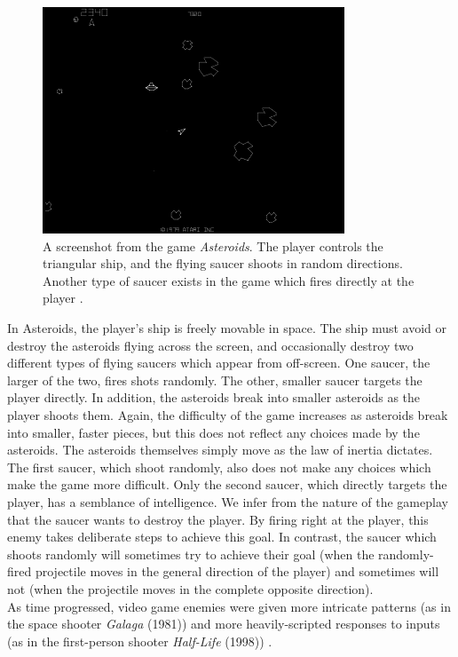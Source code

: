 \begin{figure}[H]
  \centering
  \includegraphics[width=9cm]{figures/Asteroids.png}
  \caption{A screenshot from the game \textit{Asteroids}. The player controls the triangular ship, and the flying saucer shoots in random directions. Another type of saucer exists in the game which fires directly at the player \cite{asteroids79}.}
  \label{fig:Asteroids}
\end{figure}

In Asteroids, the player's ship is freely movable in space. The ship must avoid or destroy the asteroids flying across the screen, and occasionally destroy two different types of flying saucers which appear from off-screen. One saucer, the larger of the two, fires shots randomly. The other, smaller saucer targets the player directly. In addition, the asteroids break into smaller asteroids as the player shoots them. Again, the difficulty of the game increases as asteroids break into smaller, faster pieces, but this does not reflect any choices made by the asteroids. The asteroids themselves simply move as the law of inertia dictates. The first saucer, which shoot randomly, also does not make any choices which make the game more difficult. Only the second saucer, which directly targets the player, has a semblance of intelligence. We infer from the nature of the gameplay that the saucer wants to destroy the player. By firing right at the player, this enemy takes deliberate steps to achieve this goal. In contrast, the saucer which shoots randomly will sometimes try to achieve their goal (when the randomly-fired projectile moves in the general direction of the player) and sometimes will not (when the projectile moves in the complete opposite direction).\\

As time progressed, video game enemies were given more intricate patterns (as in the space shooter \textit{Galaga} (1981)) and more heavily-scripted responses to inputs (as in the first-person shooter \textit{Half-Life} (1998)) \cite{schw04}.\\

